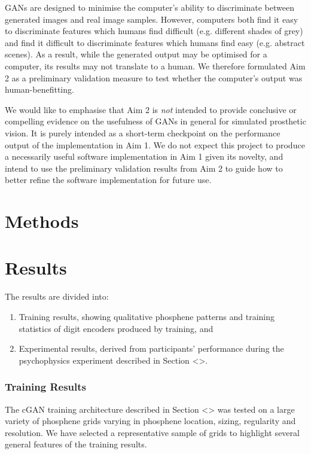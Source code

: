\documentclass[11pt]{article}
\begin{document}
GANs are designed to minimise the computer's ability to discriminate between generated images and real image samples.
However, computers both find it easy to discriminate features which humans find difficult (e.g. different shades of grey) and find it difficult to discriminate features which humans find easy (e.g. abstract scenes).
As a result, while the generated output may be optimised for a computer, its results may not translate to a human.
We therefore formulated Aim 2 as a preliminary validation measure to test whether the computer's output was human-benefitting.

We would like to emphasise that Aim 2 is \emph{not} intended to provide conclusive or compelling evidence on the usefulness of GANs in general for simulated prosthetic vision.
It is purely intended as a short-term checkpoint on the performance output of the implementation in Aim 1.
We do not expect this project to produce a necessarily useful software implementation in Aim 1 given its novelty, and intend to use the preliminary validation results from Aim 2 to guide how to better refine the software implementation for future use.



\section{Methods}
\label{sec:orgf70642c}


\section{Results}
\label{sec:org723690a}

The results are divided into:

\begin{enumerate}
\item Training results, showing qualitative phosphene patterns and training statistics of digit encoders produced by training, and
\item Experimental results, derived from participants' performance during the psychophysics experiment described in Section <>.
\end{enumerate}

\subsubsection{Training Results}
\label{sec:org989ea9d}

The cGAN training architecture described in Section <> was tested on a large variety of phosphene grids varying in phosphene location, sizing, regularity and resolution.
We have selected a representative sample of grids to highlight several general features of the training results.
\end{document}
